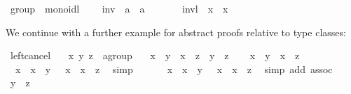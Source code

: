\begin{isabellebody}
\isamarkupfalse%
\ group\ {\isacharequal}\ monoidl\ {\isacharplus}\isanewline
\ \ \ inv\ {\isacharcolon}{\isacharcolon}\ {\isachardoublequoteopen}{\isacharprime}a\ {\isasymRightarrow}\ {\isacharprime}a{\isachardoublequoteclose}\ {\isacharparenleft}{\isachardoublequoteopen}{\isasymdiv}\ {\isacharunderscore}{\isachardoublequoteclose}\ {\isacharbrackleft}{}{}{\isacharbrackright}\ {}{}{\isacharparenright}\isanewline
\ \ \ invl{\isacharcolon}\ {\isachardoublequoteopen}{\isasymdiv}\ x\ {\isasymoplus}\ x\ {\isacharequal}\ {\isasymzero}{\isachardoublequoteclose}%
\begin{isamarkuptext}%
\noindent We continue with a further example for abstract
proofs relative to type classes:%
\end{isamarkuptext}%
\isamarkuptrue%
\isamarkupfalse%
\ left{\isacharunderscore}cancel{\isacharcolon}\isanewline
\ \ \ x\ y\ z\ {\isacharcolon}{\isacharcolon}\ {\isachardoublequoteopen}{\isacharprime}a{\isasymColon}group{\isachardoublequoteclose}\isanewline
\ \ \ {\isachardoublequoteopen}x\ {\isasymoplus}\ y\ {\isacharequal}\ x\ {\isasymoplus}\ z\ {\isasymlongleftrightarrow}\ y\ {\isacharequal}\ z{\isachardoublequoteclose}\isanewline
%
\isadelimproof
%
\endisadelimproof
%
\isatagproof
{}\isamarkupfalse%
\isanewline
\ \ \isamarkupfalse%
\ {\isachardoublequoteopen}x\ {\isasymoplus}\ y\ {\isacharequal}\ x\ {\isasymoplus}\ z{\isachardoublequoteclose}\isanewline
\ \ \isamarkupfalse%
\ \isamarkupfalse%
\ {\isachardoublequoteopen}{\isasymdiv}\ x\ {\isasymoplus}\ {\isacharparenleft}x\ {\isasymoplus}\ y{\isacharparenright}\ {\isacharequal}\ {\isasymdiv}\ x\ {\isasymoplus}\ {\isacharparenleft}x\ {\isasymoplus}\ z{\isacharparenright}{\isachardoublequoteclose}\ \isamarkupfalse%
\ simp\isanewline
\ \ \isamarkupfalse%
\ \isamarkupfalse%
\ {\isachardoublequoteopen}{\isacharparenleft}{\isasymdiv}\ x\ {\isasymoplus}\ x{\isacharparenright}\ {\isasymoplus}\ y\ {\isacharequal}\ {\isacharparenleft}{\isasymdiv}\ x\ {\isasymoplus}\ x{\isacharparenright}\ {\isasymoplus}\ z{\isachardoublequoteclose}\ \isamarkupfalse%
\ {\isacharparenleft}simp\ add{\isacharcolon}\ assoc{\isacharparenright}\isanewline
\ \ \isamarkupfalse%
\ \isamarkupfalse%
\ {\isachardoublequoteopen}y\ {\isacharequal}\ z{\isachardoublequoteclose}\ \isamarkupfalse%

\end{isabellebody}
